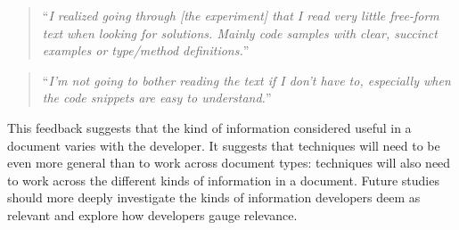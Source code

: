 \smallskip
\begin{footnotesize}
\begin{quote}
``\textit{I realized going through [the experiment] that I read very little free-form text when looking for solutions. Mainly code samples with clear, succinct examples or type/method definitions.}''
\end{quote}
\end{footnotesize}

\begin{footnotesize}
\begin{quote}
``\textit{I'm not going to bother reading the text if I don't have to, especially when the code snippets are easy to understand.}''
\end{quote}
\end{footnotesize}










\smallskip
This feedback suggests that the kind of information
considered useful in a document varies with the
developer. It suggests that techniques will need to
be even more general than to work across document
types: techniques will also need to work across
the different kinds of information in a document.
Future studies should more deeply investigate
the kinds of information developers deem as
relevant and explore how developers gauge relevance.

